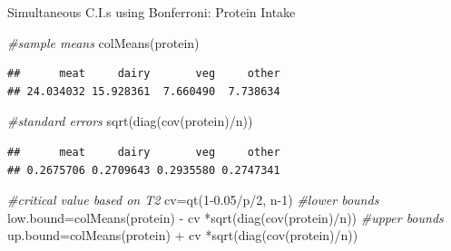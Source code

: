 \documentclass[
  ignorenonframetext,
]{beamer}
\newenvironment{Shaded}{\begin{snugshade}}{\end{snugshade}}
\newcommand{\CommentTok}[1]{\textcolor[rgb]{0.56,0.35,0.01}{\textit{#1}}}
\newcommand{\DecValTok}[1]{\textcolor[rgb]{0.00,0.00,0.81}{#1}}
\newcommand{\FloatTok}[1]{\textcolor[rgb]{0.00,0.00,0.81}{#1}}
\newcommand{\FunctionTok}[1]{\textcolor[rgb]{0.00,0.00,0.00}{#1}}
\newcommand{\NormalTok}[1]{#1}
\newcommand{\OtherTok}[1]{\textcolor[rgb]{0.56,0.35,0.01}{#1}}
\newcommand{\SpecialCharTok}[1]{\textcolor[rgb]{0.00,0.00,0.00}{#1}}
\begin{document}
\begin{frame}[fragile]{Simultaneous C.I.s using Bonferroni: Protein
Intake}
\protect\hypertarget{simultaneous-c.i.s-using-bonferroni-protein-intake}{}
\tiny

\begin{Shaded}
\begin{Highlighting}[]
\CommentTok{\#sample means}
\FunctionTok{colMeans}\NormalTok{(protein)}
\end{Highlighting}
\end{Shaded}

\begin{verbatim}
##      meat     dairy       veg     other 
## 24.034032 15.928361  7.660490  7.738634
\end{verbatim}

\begin{Shaded}
\begin{Highlighting}[]
\CommentTok{\#standard errors}
\FunctionTok{sqrt}\NormalTok{(}\FunctionTok{diag}\NormalTok{(}\FunctionTok{cov}\NormalTok{(protein)}\SpecialCharTok{/}\NormalTok{n))}
\end{Highlighting}
\end{Shaded}

\begin{verbatim}
##      meat     dairy       veg     other 
## 0.2675706 0.2709643 0.2935580 0.2747341
\end{verbatim}

\begin{Shaded}
\begin{Highlighting}[]
\CommentTok{\#critical value based on T2}
\NormalTok{cv}\OtherTok{=}\FunctionTok{qt}\NormalTok{(}\DecValTok{1}\FloatTok{{-}0.05}\SpecialCharTok{/}\NormalTok{p}\SpecialCharTok{/}\DecValTok{2}\NormalTok{, n}\DecValTok{{-}1}\NormalTok{)}
\CommentTok{\#lower bounds}
\NormalTok{low.bound}\OtherTok{=}\FunctionTok{colMeans}\NormalTok{(protein) }\SpecialCharTok{{-}}\NormalTok{ cv }\SpecialCharTok{*}\FunctionTok{sqrt}\NormalTok{(}\FunctionTok{diag}\NormalTok{(}\FunctionTok{cov}\NormalTok{(protein)}\SpecialCharTok{/}\NormalTok{n))}
\CommentTok{\#upper bounds}
\NormalTok{up.bound}\OtherTok{=}\FunctionTok{colMeans}\NormalTok{(protein) }\SpecialCharTok{+}\NormalTok{ cv }\SpecialCharTok{*}\FunctionTok{sqrt}\NormalTok{(}\FunctionTok{diag}\NormalTok{(}\FunctionTok{cov}\NormalTok{(protein)}\SpecialCharTok{/}\NormalTok{n))}
\end{Highlighting}
\end{Shaded}

\normalsize
\end{frame}
\end{document}
